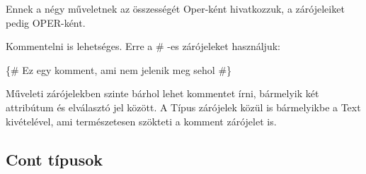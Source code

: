 Ennek a négy műveletnek az összességét Oper-ként hivatkozzuk, a zárójeleiket pedig OPER-ként.

Kommentelni is lehetséges. Erre a \# -es zárójeleket használjuk:

\{\# Ez egy komment, ami nem jelenik meg sehol \#\}

Műveleti zárójelekben szinte bárhol lehet kommentet írni, bármelyik két attribútum és elválasztó jel között.
A Típus zárójelek közül is bármelyikbe a Text kivételével, ami természetesen szökteti a komment zárójelet is.

\subsection{Cont típusok}
\label{sec:SCont}

